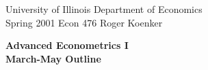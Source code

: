 
\setlength{\textwidth}{170mm}
\setlength{\textheight}{220mm}
\setlength{\oddsidemargin}{0mm}
\setlength{\evensidemargin}{10mm}
\setlength{\topmargin}{-10mm}
\def\RR{\hbox{\raise.4ex\hbox{$\scriptstyle{|}$}\hskip-1.85pt R}}
\newcommand{\REF}{\nopagebreak\noindent{\large{\bf
      References}}\vspace{.2in}}

\newcommand{\Ref}[1]{\medskip\noindent\hangafter=1
      \hangindent=20pt\ignorespaces #1}
\pagestyle{empty}



\noindent
University of Illinois \hfill Department of Economics \\
Spring 2001 \hfill Econ 476 \hfill Roger Koenker

\begin{center}
\large{
{\bf Advanced Econometrics I \\
March-May Outline}}
\end{center}

